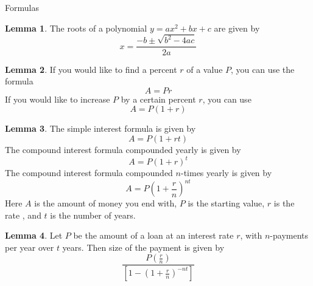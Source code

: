\documentclass[addpoints,12pt]{exam}
\theoremstyle{definition}
\newtheorem{lemma}{Lemma}
\begin{document}
\begin{center}
\end{center}
\vspace{0.1in}
\vspace{0.2in}



\begin{center}
    \Huge Formulas
\end{center}

\begin{lemma}
    The roots of a polynomial $y = ax^{2}+bx+c$ are given by 
		\[
		x = \frac{-b \pm \sqrt{b^{2}-4ac}}{2a}
		\]
\end{lemma}

\begin{lemma}
    If you would like to find a percent $r$ of a value $P$, you can use the formula 
		\[
		A = Pr
		\]
		If you would like to increase $P$ by a certain percent $r$, you can use 
		\[
		A = P(1+r)
		\]
\end{lemma}

\begin{lemma}
	The simple interest formula is given by 
    \[
    A = P(1+rt)
    \]
		The compound interest formula compounded yearly is given by 
		\[
		A = P(1+r)^{t} 
		\]
		The compound interest formula compounded $n$-times yearly is given by 
		\[
		A = P(1+\frac{r}{n})^{nt}
		\]
		Here $A$ is the amount of money you end with, $P$ is the starting value, $r$ is the rate , and $t$ is the number of years. 
\end{lemma}
\begin{lemma}
	Let $P$ be the amount of a loan at an interest rate $r$, with $n$-payments per year over $t$ years. Then size of the payment is given by 
	\[
	\frac{P(\frac{r}{n})}{\left[1-\left(1+\frac{r}{n}\right)^{-nt}\right]}
	\]
\end{lemma}
\end{document}
